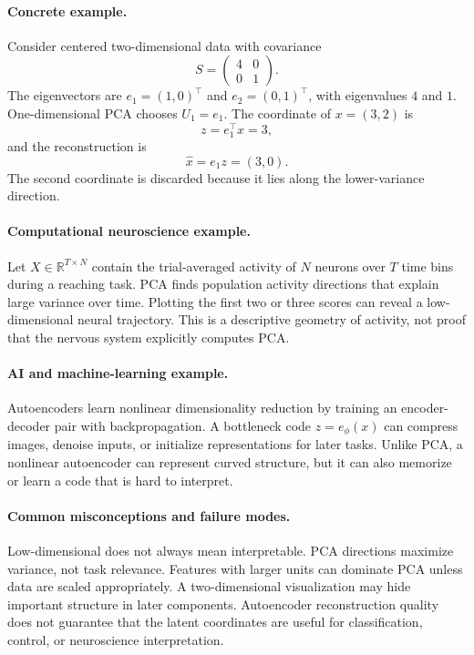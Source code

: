 \paragraph{Concrete example.}
Consider centered two-dimensional data with covariance
\[
S=\begin{pmatrix}4&0\\0&1\end{pmatrix}.
\]
The eigenvectors are \(e_1=(1,0)^\top\) and \(e_2=(0,1)^\top\), with eigenvalues \(4\) and \(1\). One-dimensional PCA chooses \(U_1=e_1\). The coordinate of \(x=(3,2)\) is
\[
z=e_1^\top x=3,
\]
and the reconstruction is
\[
\widehat x=e_1z=(3,0).
\]
The second coordinate is discarded because it lies along the lower-variance direction.

\paragraph{Computational neuroscience example.}
Let \(X\in\mathbb R^{T\times N}\) contain the trial-averaged activity of \(N\) neurons over \(T\) time bins during a reaching task. PCA finds population activity directions that explain large variance over time. Plotting the first two or three scores can reveal a low-dimensional neural trajectory. This is a descriptive geometry of activity, not proof that the nervous system explicitly computes PCA.

\paragraph{AI and machine-learning example.}
Autoencoders learn nonlinear dimensionality reduction by training an encoder-decoder pair with backpropagation. A bottleneck code \(z=e_\phi(x)\) can compress images, denoise inputs, or initialize representations for later tasks. Unlike PCA, a nonlinear autoencoder can represent curved structure, but it can also memorize or learn a code that is hard to interpret.

\paragraph{Common misconceptions and failure modes.}
Low-dimensional does not always mean interpretable. PCA directions maximize variance, not task relevance. Features with larger units can dominate PCA unless data are scaled appropriately. A two-dimensional visualization may hide important structure in later components. Autoencoder reconstruction quality does not guarantee that the latent coordinates are useful for classification, control, or neuroscience interpretation.

